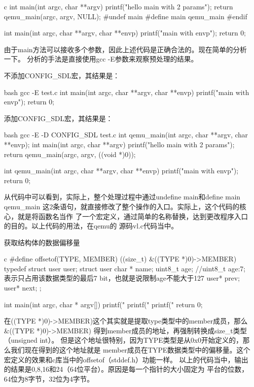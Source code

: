 \begin{outline}[enumerate]
\begin{code-block}{c}
int main(int argc, char **argv)
{
    printf("hello main with 2 params\n");
    return qemu_main(argc, argv, NULL);
}
#undef main
#define main qemu_main
#endif

int main(int argc, char **argv, char **envp)
{
    printf("main with envp\n");
    return 0;
}
\end{code-block}
由于main方法可以接收多个参数，因此上述代码是正确合法的。现在简单的分析一下。
分析的手法是直接使用gcc -E参数来观察预处理的结果。

不添加CONFIG\_SDL宏，其结果是：
\begin{code-block}{bash}
gcc -E test.c
int main(int argc, char **argv, char **envp)
{
    printf("main with envp\n");
    return 0;
}
\end{code-block}
添加CONFIG\_SDL宏，其结果是：
\begin{code-block}{bash}
gcc -E -D CONFIG_SDL test.c
int qemu_main(int argc, char **argv, char **envp);
int main(int argc, char **argv)
{
    printf("hello main with 2 params\n");
    return qemu_main(argc, argv, ((void *)0));
}

int qemu_main(int argc, char **argv, char **envp)
{
    printf("main with envp\n");
    return 0;
}
\end{code-block}
从代码中可以看到，实际上，整个处理过程中通过undefine main和define main qemu\_main
这2条语句，就直接修改了整个操作的入口。实际上，这个代码的核心，就是将函数名当作
了一个宏定义，通过简单的名称替换，达到更改程序入口的目的。以上代码的用法，在qemu的
源码vl.c代码当中。

\1 获取结构体的数据偏移量
\begin{code-block}{c}
#define offsetof(TYPE, MEMBER) ((size_t) &((TYPE *)0)->MEMBER)
typedef struct user user;
struct user{
    char * name;
    uint8_t age;
    //uint8_t age:7; 表示只占用该数据类型的最后7 bit，也就是说限制age不能大于127
    user* prev;
    user* next;
};

int main(int argc, char * argv[])
{
    printf("%
    printf("%
    printf("%
    return 0;
}
\end{code-block}

在((TYPE *)0)->MEMBER)这个其实就是提取type类型中的member成员，那么\&((TYPE *)0)->MEMBER)
得到member成员的地址，再强制转换成size\_t类型（unsigned int）。
但是这个地址很特别，因为TYPE类型是从0x0开始定义的，那么我们现在得到的这个地址就是
member成员在TYPE数据类型中的偏移量。这个宏定义的效果和c库当中的offsetof（stddef.h）功能一样。
以上的代码当中，输出的结果是0,8,16和24（64位平台）。原因是每一个指针的大小固定为
平台的位数，64位为8字节，32位为4字节。


\end{outline}
